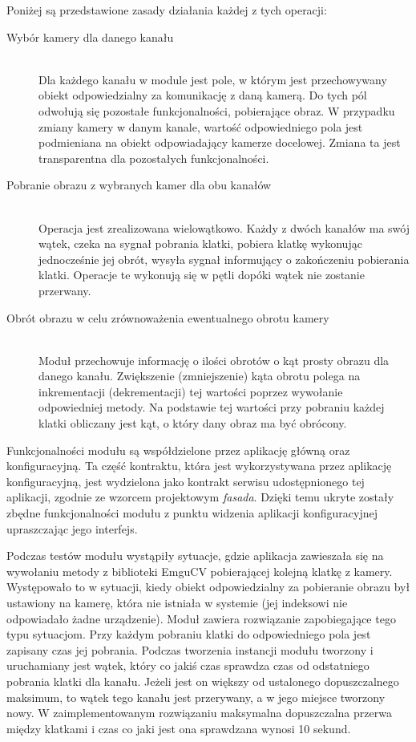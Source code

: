 \documentclass[a4paper,11pt,twoside]{report}
\theoremstyle{definition}
\begin{document}
Poniżej są przedstawione zasady działania każdej z tych operacji:
\begin{description}
\item [Wybór kamery dla danego kanału] \hfill \\
Dla każdego kanału w module jest pole, w którym jest przechowywany obiekt odpowiedzialny za komunikację z daną kamerą. Do tych pól odwołują się pozostałe funkcjonalności, pobierające obraz. W przypadku zmiany kamery w danym kanale, wartość odpowiedniego pola jest podmieniana na obiekt odpowiadający kamerze docelowej. Zmiana ta jest transparentna dla pozostałych funkcjonalności.
\item [Pobranie obrazu z wybranych kamer dla obu kanałów] \hfill \\
Operacja jest zrealizowana wielowątkowo. Każdy z dwóch kanałów ma swój wątek, czeka na sygnał pobrania klatki, pobiera klatkę wykonując jednocześnie jej obrót, wysyła sygnał informujący o zakończeniu pobierania klatki. Operacje te wykonują się w pętli dopóki wątek nie zostanie przerwany.

\pagebreak
\item [Obrót obrazu w celu zrównoważenia ewentualnego obrotu kamery] \hfill \\
Moduł przechowuje informację o ilości obrotów o kąt prosty obrazu dla danego kanału. Zwiększenie (zmniejszenie) kąta obrotu polega na inkrementacji (dekrementacji) tej wartości poprzez wywołanie odpowiedniej metody. Na podstawie tej wartości przy pobraniu każdej klatki obliczany jest kąt, o który dany obraz ma być obrócony.
\end{description}

Funkcjonalności modułu są współdzielone przez aplikację główną oraz konfiguracyjną. Ta część kontraktu, która jest wykorzystywana przez aplikację konfiguracyjną, jest wydzielona jako kontrakt serwisu udostępnionego tej aplikacji, zgodnie ze wzorcem projektowym \textit{fasada}. Dzięki temu ukryte zostały zbędne funkcjonalności modułu z punktu widzenia aplikacji konfiguracyjnej upraszczając jego interfejs.

Podczas testów modułu wystąpiły sytuacje, gdzie aplikacja zawieszała się na wywołaniu metody z biblioteki EmguCV pobierającej kolejną klatkę z kamery. Występowało to w sytuacji, kiedy obiekt odpowiedzialny za pobieranie obrazu był ustawiony na kamerę, która nie istniała w systemie (jej indeksowi nie odpowiadało żadne urządzenie). Moduł zawiera rozwiązanie zapobiegające tego typu sytuacjom. Przy każdym pobraniu klatki do odpowiedniego pola jest zapisany czas jej pobrania. Podczas tworzenia instancji modułu tworzony i uruchamiany jest wątek, który co jakiś czas sprawdza czas od odstatniego pobrania klatki dla kanału. Jeżeli jest on większy od ustalonego dopuszczalnego maksimum, to wątek tego kanału jest przerywany, a w jego miejsce tworzony nowy. 
W zaimplementowanym rozwiązaniu maksymalna dopuszczalna przerwa między klatkami i czas co jaki jest ona sprawdzana wynosi 10 sekund.
\end{document}

